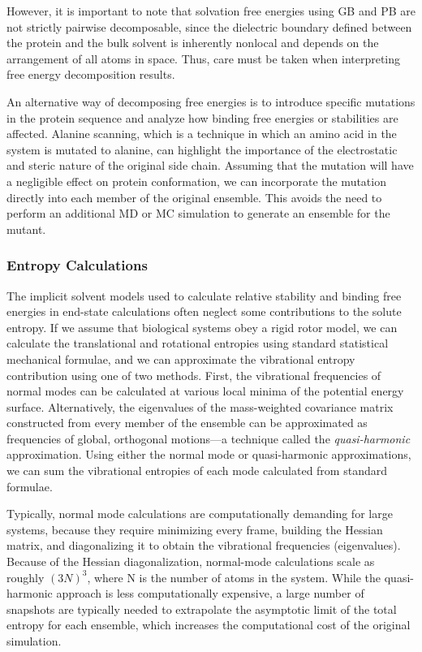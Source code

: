 However, it is important to note that solvation free energies using GB and PB
are not strictly pairwise decomposable, since the dielectric boundary defined
between the protein and the bulk solvent is inherently nonlocal and depends on
the arrangement of all atoms in space. Thus, care must be taken when
interpreting free energy decomposition results.

An alternative way of decomposing free energies is to introduce specific
mutations in the protein sequence and analyze how binding free energies or
stabilities are affected. \cite{Massova2000} Alanine scanning, which is a
technique in which an amino acid in the system is mutated to alanine, can
highlight the importance of the electrostatic and steric nature of the original
side chain. \cite{Massova1999} Assuming that the mutation will have a negligible
effect on protein conformation, we can incorporate the mutation directly into
each member of the original ensemble. This avoids the need to perform an
additional MD or MC simulation to generate an ensemble for the mutant.

\subsubsection{Entropy Calculations}

The implicit solvent models used to calculate relative stability and binding
free energies in end-state calculations often neglect some contributions to the
solute entropy. If we assume that biological systems obey a rigid rotor model,
we can calculate the translational and rotational entropies using standard
statistical mechanical formulae, \cite{McQuarrie_Book_StatMech_1973} and we can
approximate the vibrational entropy contribution using one of two methods.
First, the vibrational frequencies of normal modes can be calculated at various
local minima of the potential energy surface.
\cite{McQuarrie_Book_StatMech_1973} Alternatively, the eigenvalues of the
mass-weighted covariance matrix constructed from every member of the ensemble
can be approximated as frequencies of global, orthogonal motions---a technique
called the \emph{quasi-harmonic} approximation.
\cite{Brooks_JComputChem_1995_v16_p1522} Using either the normal mode or
quasi-harmonic approximations, we can sum the vibrational entropies of each mode
calculated from standard formulae. \cite{McQuarrie_Book_StatMech_1973}

Typically, normal mode calculations are computationally demanding for large
systems, because they require minimizing every frame, building the Hessian
matrix, and diagonalizing it to obtain the vibrational frequencies
(eigenvalues). Because of the Hessian diagonalization, normal-mode calculations
scale as roughly $(3N)^3$, where N is the number of atoms in the system. While the
quasi-harmonic approach is less computationally expensive, a large number of
snapshots are typically needed to extrapolate the asymptotic limit of the total
entropy for each ensemble, which increases the computational cost of the
original simulation. \cite{Wang2001}

